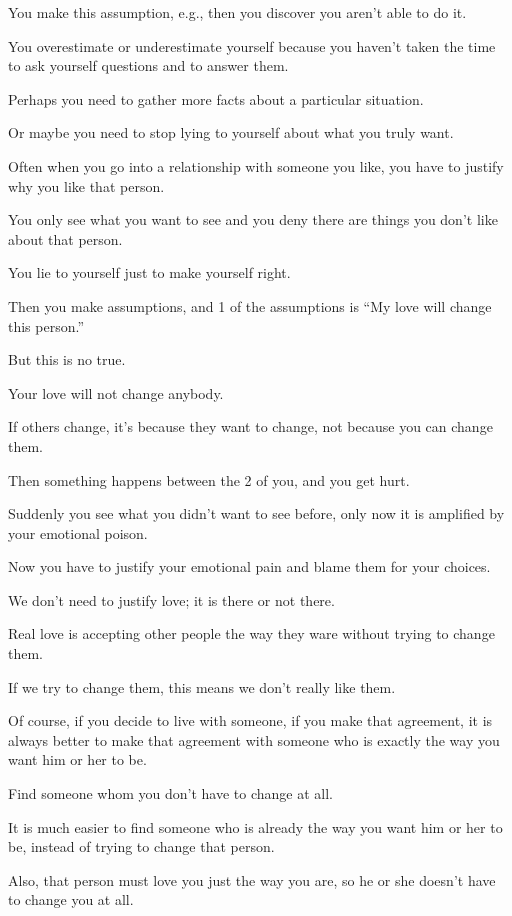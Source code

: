 \documentclass{article}
\numberwithin{equation}{section}
\begin{document}
You make this assumption, e.g., then you discover you aren't able to do it.

You overestimate or underestimate yourself because you haven't taken the time to ask yourself questions and to answer them.

Perhaps you need to gather more facts about a particular situation.

Or maybe you need to stop lying to yourself about what you truly want.

%
Often when you go into a relationship with someone you like, you have to justify why you like that person.

You only see what you want to see and you deny there are things you don't like about that person.

You lie to yourself just to make yourself right.

Then you make assumptions, and 1 of the assumptions is ``My love will change this person.''

But this is no true.

Your love will not change anybody.

If others change, it's because they want to change, not because you can change them.

Then something happens between the 2 of you, and you get hurt.

Suddenly you see what you didn't want to see before, only now it is amplified by your emotional poison.

Now you have to justify your emotional pain and blame them for your choices.

%
We don't need to justify love; it is there or not there.

Real love is accepting other people the way they ware without trying to change them.

If we try to change them, this means we don't really like them.

Of course, if you decide to live with someone, if you make that agreement, it is always better to make that agreement with someone who is exactly the way you want him or her to be.

Find someone whom you don't have to change at all.

It is much easier to find someone who is already the way you want him or her to be, instead of trying to change that person.

Also, that person must love you just the way you are, so he or she doesn't have to change you at all.
\end{document}
